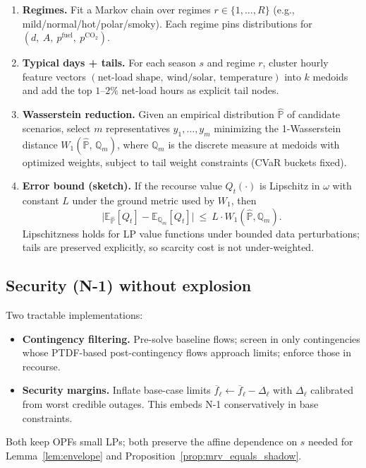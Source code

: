 \documentclass[11pt]{article}
\newcommand{\E}{\mathbb{E}}
\numberwithin{equation}{section}
\theoremstyle{definition}
\theoremstyle{remark}
\begin{document}
\begin{enumerate}[leftmargin=1.2em,itemsep=0.25em]
  \item \textbf{Regimes.} Fit a Markov chain over regimes $r\in\{1,\dots,R\}$ (e.g., mild/normal/hot/polar/smoky). Each regime pins distributions for $(d,\ A,\ p^{\mathrm{fuel}},\ p^{\mathrm{CO}_2})$.
  \item \textbf{Typical days + tails.} For each season $s$ and regime $r$, cluster hourly feature vectors $(\text{net-load shape},\ \text{wind/solar},\ \text{temperature})$ into $k$ medoids and add the top $1$--$2\%$ net-load hours as explicit tail nodes.
  \item \textbf{Wasserstein reduction.} Given an empirical distribution $\widehat{\mathbb{P}}$ of candidate scenarios, select $m$ representatives $y_1,\dots,y_m$ minimizing the 1-Wasserstein distance $W_1(\widehat{\mathbb{P}},\,\mathbb{Q}_m)$, where $\mathbb{Q}_m$ is the discrete measure at medoids with optimized weights, subject to tail weight constraints (CVaR buckets fixed).
  \item \textbf{Error bound (sketch).} If the recourse value $Q_t(\cdot)$ is Lipschitz in $\omega$ with constant $L$ under the ground metric used by $W_1$, then
  \[
  \big| \E_{\widehat{\mathbb{P}}}[Q_t]-\E_{\mathbb{Q}_m}[Q_t]\big|\ \le\ L\cdot W_1(\widehat{\mathbb{P}},\mathbb{Q}_m).
  \]
  Lipschitzness holds for LP value functions under bounded data perturbations; tails are preserved explicitly, so scarcity cost is not under-weighted.
\end{enumerate}

\subsection{ Security (N-1) without explosion}
\label{sec:annexF_security}

Two tractable implementations:
\begin{itemize}[leftmargin=1.2em,itemsep=0.25em]
  \item \textbf{Contingency filtering.} Pre-solve baseline flows; screen in only contingencies whose PTDF-based post-contingency flows approach limits; enforce those in recourse.
  \item \textbf{Security margins.} Inflate base-case limits $\overline f_\ell\leftarrow \overline f_\ell - \Delta_\ell$ with $\Delta_\ell$ calibrated from worst credible outages. This embeds N-1 conservatively in base constraints.
\end{itemize}
Both keep OPFs small LPs; both preserve the affine dependence on $s$ needed for Lemma~\ref{lem:envelope} and Proposition~\ref{prop:mrv_equals_shadow}.
\end{document}

